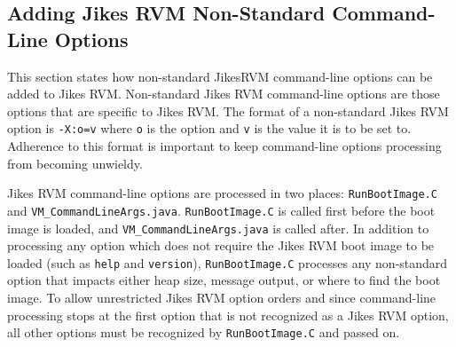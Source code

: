 \subsection{Adding Jikes RVM Non-Standard Command-Line Options}
This section states how non-standard Jikes\trademark RVM command-line
options can be added to Jikes RVM.  Non-standard Jikes RVM
command-line options are those options that are specific to Jikes RVM.
The format of a non-standard Jikes RVM option is {\tt -X:o=v} where
{\tt o} is the option and {\tt v} is the value it is to be set to.
Adherence to this format is important to keep command-line options
processing from becoming unwieldy.

Jikes RVM command-line options are processed in two places: 
{\tt RunBootImage.C} and {\tt VM\_CommandLineArgs.java}.  
{\tt RunBootImage.C} is called first before the boot image is loaded, and
{\tt VM\_CommandLineArgs.java} is called after.  In addition to
processing any option which does not require the Jikes RVM boot image
to be loaded (such as {\tt help} and {\tt version}), 
{\tt RunBootImage.C} processes any non-standard option that impacts either
heap size, message output, or where to find the boot image.  To allow
unrestricted Jikes RVM option orders and since command-line processing
stops at the first option that is not recognized as a Jikes RVM
option, all other options must be recognized by {\tt RunBootImage.C}
and passed on.

\JikesTMFooter
